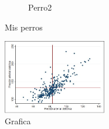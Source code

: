 \documentclass{article}
\begin{document}
\begin{figure}[h!]
\begin{subfigure}[b]{0.47\linewidth}
        \caption{Perro2}
        \label{figs:perro2}
    \end{subfigure}  
    \caption{Mis perros}
    \label{fig:misperros} 
\end{figure}

\lipsum[1]
\begin{figure}
    \centering
    \includegraphics[width=0.4\textwidth]{grafica1.jpg}
    \caption{Grafica}
    \label{fig:myfig}
\end{figure}
\lipsum[1]
\end{document}
